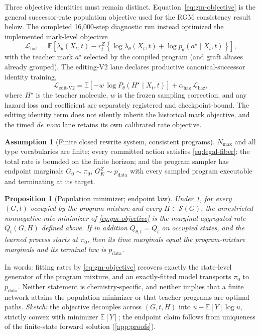 \documentclass{article}
\newcommand{\rgm}{\textsc{RGM}\xspace}
\newcommand{\Sset}{\mathcal{S}}
\newcommand{\pdata}{p_{\mathrm{data}}}
\newcommand{\pzero}{\pi_0}
\newcommand{\E}{\mathbb{E}}
\newcommand{\Pmol}{P_{\theta}}
\newtheorem{proposition}[theorem]{Proposition}
\theoremstyle{definition}
\newtheorem{assumption}[theorem]{Assumption}
\theoremstyle{remark}
\begin{document}
Three objective identities must remain distinct. Equation~\eqref{eq:gm-objective} is the general successor-rate population objective used for the \rgm consistency result below. The completed 16,000-step diagnostic run instead optimized the implemented mark-level objective
\begin{equation}
\mathcal L_{\mathrm{hist}}=
\E\!\left[\lambda_\theta(X_t,t)-r_t^Z\!\left\{\log\lambda_\theta(X_t,t)+\log p_\theta(a^\star\mid X_t,t)\right\}\right],
\label{eq:historical-mark-objective}
\end{equation}
with the teacher mark $a^\star$ selected by the compiled program (and graft aliases already grouped). The editing-V2 lane declares productive canonical-successor identity training,
\begin{equation}
\mathcal L_{\mathrm{edit\text{-}V2}}
=
\E\!\left[-w\,\log \Pmol(H^\star\mid X_t,t)\right]
+\alpha_{\mathrm{haz}}\,\mathcal L_{\mathrm{haz}},
\label{eq:editing-v2-objective}
\end{equation}
where $H^\star$ is the teacher molecule, $w$ is the frozen sampling correction, and any hazard loss and coefficient are separately registered and checkpoint-bound. The editing identity term does not silently inherit the historical mark objective, and the timed \emph{de novo} lane retains its own calibrated rate objective.

\begin{assumption}[Finite closed rewrite system, consistent programs]\label{ass:finite}
$N_{\max}$ and all type vocabularies are finite; every committed action satisfies \eqref{eq:legal-fiber}; the total rate is bounded on the finite horizon; and the program sampler has endpoint marginals $G_0\sim\pzero$, $G^Z_K\sim\pdata$ with every sampled program executable and terminating at its target.
\end{assumption}

\begin{proposition}[Population minimizer; endpoint law]\label{prop:gm}
Under \cref{ass:finite}, for every $(G,t)$ occupied by the program mixture and every $H\in\Sset(G)$, the unrestricted nonnegative-rate minimizer of \eqref{eq:gm-objective} is the marginal aggregated rate $Q_t(G,H)$ defined above. If in addition $Q_{\theta,t}=Q_t$ on occupied states, and the learned process starts at $\pzero$, then its time marginals equal the program-mixture marginals and its terminal law is $\pdata$.
\end{proposition}

In words: fitting rates by \eqref{eq:gm-objective} recovers exactly the state-level generator of the program mixture, and an exactly-fitted model transports $\pzero$ to $\pdata$. Neither statement is chemistry-specific, and neither implies that a finite network attains the population minimizer or that teacher programs are optimal paths. \emph{Sketch:} the objective decouples across $(G,t,H)$ into $u-\E[Y]\log u$, strictly convex with minimizer $\E[Y]$; the endpoint claim follows from uniqueness of the finite-state forward solution (\cref{app:proofs}).
\end{document}
